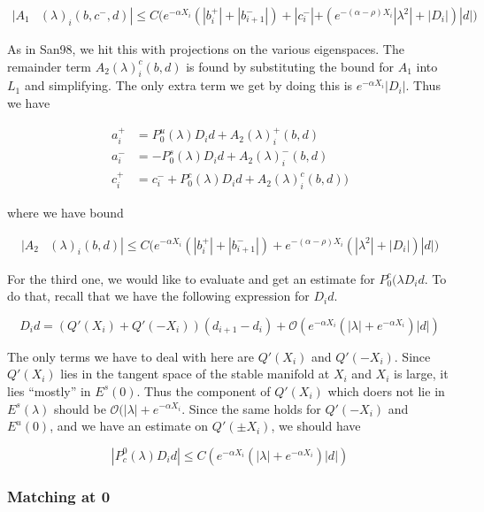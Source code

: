 \documentclass[12pt]{article}
\begin{document}
\begin{align*}
|A_1&(\lambda)_i(b, c^-, d)|
\leq C \Big( e^{-\alpha X_i} (|b_i^+| + |b_{i+1}^-|) + |c_i^-| + (e^{-(\alpha - \rho) X_i} |\lambda^2| + |D_i|)|d| \Big)
\end{align*} 

As in San98, we hit this with projections on the various eigenspaces. The remainder term $A_2(\lambda)_i^c(b, d)$ is found by substituting the bound for $A_1$ into $L_1$ and simplifying. The only extra term we get by doing this is $e^{-\alpha X_i} |D_i|$. Thus we have

\begin{align*}
a_i^+ &= P_0^u(\lambda) D_i d + A_2(\lambda)_i^+(b, d) \\
a_i^- &= -P_0^s(\lambda) D_i d + A_2(\lambda)_i^-(b, d) \\
c_i^+ &= c_i^- + P_0^c(\lambda) D_i d + A_2(\lambda)_i^c(b, d) )
\end{align*}

where we have bound

\begin{align*}
|A_2&(\lambda)_i(b, d)|
\leq C \Big( e^{-\alpha X_i} (|b_i^+| + |b_{i+1}^-|) + e^{-(\alpha - \rho) X_i} (|\lambda^2| + |D_i|)|d| \Big)
\end{align*} 

For the third one, we would like to evaluate and get an estimate for $P_0^c(\lambda D_i d$. To do that, recall that we have the following expression for $D_i d$.

\[
D_i d = ( Q'(X_i) + Q'(-X_i))(d_{i+1} - d_i ) + \mathcal{O} \left( e^{-\alpha X_i} \left( |\lambda| +  e^{-\alpha X_i}  \right) |d| \right)
\]

The only terms we have to deal with here are $Q'(X_i)$ and $Q'(-X_i)$. Since $Q'(X_i)$ lies in the tangent space of the stable manifold at $X_i$ and $X_i$ is large, it lies ``mostly'' in $E^s(0)$. Thus the component of $Q'(X_i)$ which doers not lie in $E^s(\lambda)$ should be $\mathcal{O}(|\lambda| + e^{-\alpha X_i}$. Since the same holds for $Q'(-X_i)$ and $E^u(0)$, and we have an estimate on $Q'(\pm X_i)$, we should have

\[
|P^0_c(\lambda) D_i d| \leq C \left( e^{-\alpha X_i} \left( |\lambda| +  e^{-\alpha X_i}  \right) |d| \right)
\]

\subsubsection*{Matching at 0}
\end{document}
